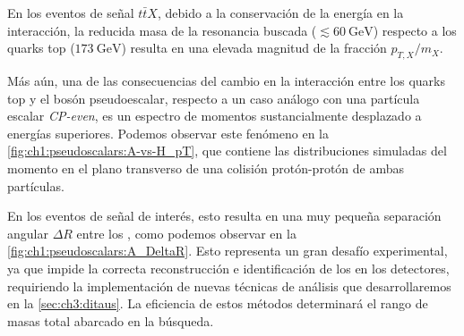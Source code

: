 En los eventos de señal $t\bar{t}X$, debido a la conservación de la energía en la interacción, la reducida masa de la resonancia buscada ($\lesssim \SI{60}{\GeV}$) respecto a los quarks top ($\SI{173}{\GeV}$) resulta en una elevada magnitud de la fracción $p_{T, X}/m_X$.

Más aún, una de las consecuencias del cambio en la interacción entre los quarks top y el bosón pseudoescalar, respecto a un caso análogo con una partícula escalar \textit{CP-even}, es un espectro de momentos sustancialmente desplazado a energías superiores. Podemos observar este fenómeno en la \cref{fig:ch1:pseudoscalars:A-vs-H_pT}, que contiene las distribuciones simuladas del momento en el plano transverso de una colisión protón-protón de ambas partículas.

En los eventos de señal de interés, esto resulta en una muy pequeña separación angular $\Delta R$ entre los \ttaus, como podemos observar en la \cref{fig:ch1:pseudoscalars:A_DeltaR}. Esto representa un gran desafío experimental, ya que impide la correcta reconstrucción e identificación de los \thads en los detectores, requiriendo la implementación de nuevas técnicas de análisis que desarrollaremos en la \cref{sec:ch3:ditaus}. La eficiencia de estos métodos determinará el rango de masas total abarcado en la búsqueda.


\cleardoublepage{}